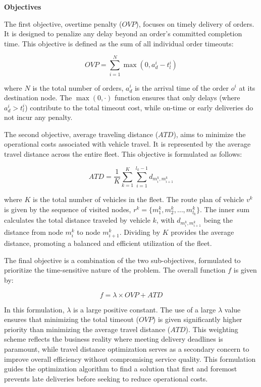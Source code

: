 \documentclass[preprint,12pt]{elsarticle}
\begin{document}
\textbf{Objectives}

The first objective, overtime penalty ($OVP$), focuses on timely delivery of orders. It is designed to penalize any delay beyond an order's committed completion time. This objective is defined as the sum of all individual order timeouts:

\begin{equation}
OVP = \sum_{i=1}^{N} \max(0, a_d^i - t_l^i)
\end{equation}

where $N$ is the total number of orders, $a_d^i$ is the arrival time of the order $o^i$ at its destination node. The $\max(0, \cdot)$ function ensures that only delays (where $a_d^i > t_l^i$) contribute to the total timeout cost, while on-time or early deliveries do not incur any penalty.

The second objective, average traveling distance ($ATD$), aims to minimize the operational costs associated with vehicle travel. It is represented by the average travel distance across the entire fleet. This objective is formulated as follows:

\begin{equation}
ATD = \frac{1}{K} \sum_{k=1}^{K} \sum_{i=1}^{l_k - 1} d_{m_i^k, m_{i+1}^k}
\end{equation}

where $K$ is the total number of vehicles in the fleet. The route plan of vehicle $v^k$ is given by the sequence of visited nodes, $r^k = \{m_1^k, m_2^k, \dots, m_{l_k}^k\}$. The inner sum calculates the total distance traveled by vehicle $k$, with $d_{m_i^k, m_{i+1}^k}$ being the distance from node $m_i^k$ to node $m_{i+1}^k$. Dividing by $K$ provides the average distance, promoting a balanced and efficient utilization of the fleet.

The final objective is a combination of the two sub-objectives, formulated to prioritize the time-sensitive nature of the problem. The overall function $f$ is given by:

\begin{equation}\label{eq:f}
f = \lambda \times OVP + ATD    
\end{equation}

In this formulation, $\lambda$ is a large positive constant. The use of a large $\lambda$ value ensures that minimizing the total timeout ($OVP$) is given significantly higher priority than minimizing the average travel distance ($ATD$). This weighting scheme reflects the business reality where meeting delivery deadlines is paramount, while travel distance optimization serves as a secondary concern to improve overall efficiency without compromising service quality. This formulation guides the optimization algorithm to find a solution that first and foremost prevents late deliveries before seeking to reduce operational costs.
\end{document}
